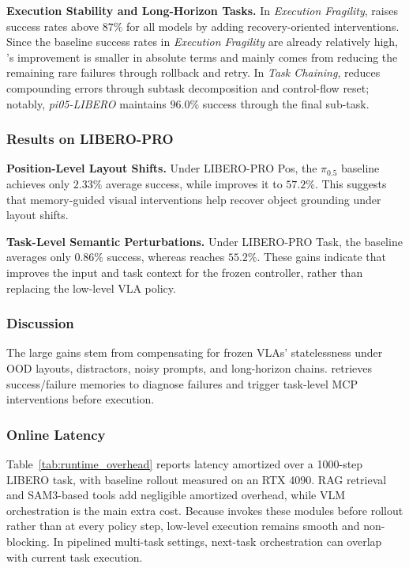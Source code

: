 \noindent\textbf{Execution Stability and Long-Horizon Tasks.}
In \textit{Execution Fragility}, {\sys} raises success rates above $87\%$ for all models by adding recovery-oriented interventions.
{\color{black}Since the baseline success rates in \textit{Execution Fragility} are already relatively high, {\sys}'s improvement is smaller in absolute terms and mainly comes from reducing the remaining rare failures through rollback and retry.}
In \textit{Task Chaining}, {\sys} reduces compounding errors through subtask decomposition and control-flow reset; notably, \textit{pi05-LIBERO} maintains $96.0\%$ success through the final sub-task.


\subsubsection{Results on LIBERO-PRO}

\noindent\textbf{Position-Level Layout Shifts.}
Under LIBERO-PRO Pos, the $\pi_{0.5}$ baseline achieves only $2.33\%$ average success, while {\sys} improves it to $57.2\%$.
{\color{black}This suggests that memory-guided visual interventions help recover object grounding under layout shifts.}

\noindent\textbf{Task-Level Semantic Perturbations.}
Under LIBERO-PRO Task, the baseline averages only $0.86\%$ success, whereas {\sys} reaches $55.2\%$.
{\color{black}These gains indicate that {\sys} improves the input and task context for the frozen controller, rather than replacing the low-level VLA policy.}

{\color{black}
\subsubsection{Discussion}
The large gains stem from compensating for frozen VLAs' statelessness under OOD layouts, distractors, noisy prompts, and long-horizon chains.
{\sys} retrieves success/failure memories to diagnose failures and trigger task-level MCP interventions before execution.
}

{\color{black}
\subsubsection{Online Latency}
Table~\ref{tab:runtime_overhead} reports latency amortized over a 1000-step LIBERO task, with baseline rollout measured on an RTX 4090.
RAG retrieval and SAM3-based tools add negligible amortized overhead, while VLM orchestration is the main extra cost.
Because {\sys} invokes these modules before rollout rather than at every policy step, low-level execution remains smooth and non-blocking.
In pipelined multi-task settings, next-task orchestration can overlap with current task execution.
}





